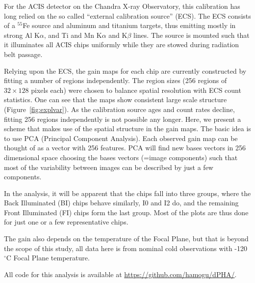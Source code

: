 \documentclass[]{spie}  %
\begin{document}
For the ACIS detector on the Chandra X-ray Observatory, this calibration has long relied on the so called ``external calibration source'' (ECS). The ECS consists of a $^{55}$Fe source and aluminum and titanium targets, thus emitting mostly in strong Al K$\alpha$, and Ti and Mn K$\alpha$ and K$\beta$ lines. The source is mounted such that it illuminates all ACIS chips uniformly while they are stowed during radiation belt passage.

Relying upon the ECS, the gain maps for each chip are currently constructed by fitting a number of regions independently. The region sizes (256 regions of $32 \times 128$ pixels each) were chosen to balance spatial resolution with ECS count statistics. One can see that the maps show consistent large scale structure (Figure~\ref{fig:explvar}). As the calibration source ages and count rates decline, fitting 256 regions independently is not possible any longer. Here, we present a scheme that makes use of the spatial structure in the gain maps.
The basic idea is to use PCA (Principal Component Analysis). Each observed gain map can be thought of as a vector with 256 features. PCA will find new bases vectors in 256 dimensional space choosing the bases vectors (=image components) such that most of the variability between images can be described by just a few components.

In the analysis, it will be apparent that the chips fall into three groups, where the Back Illuminated (BI) chips behave similarly, I0 and I2 do, and the remaining Front Illuminated (FI) chips form the last group. Most of the plots are thus done for just one or a few representative chips.

The gain also depends on the temperature of the Focal Plane, but that is beyond the scope of this study, all data here is from nominal cold observations with -120 $^\circ$C Focal Plane temperature.

All code for this analysis is available at \url{https://github.com/hamogu/dPHA/}.
\end{document}
